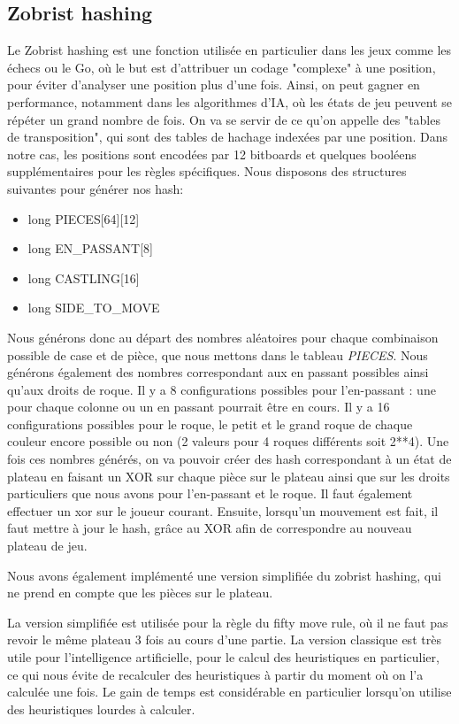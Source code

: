 \documentclass{article}
\begin{document}
\subsection{Zobrist hashing} \label{Zobrist}
Le Zobrist hashing est une fonction utilisée en particulier dans les jeux comme les échecs ou le Go, où le but est d'attribuer un codage "complexe" à
une position, pour éviter d'analyser une position plus d'une fois. Ainsi, on peut gagner en performance, notamment dans les algorithmes d'IA, où les
états de jeu peuvent se répéter un grand nombre de fois. On va se servir de ce qu'on appelle des "tables de transposition", qui sont des tables de
hachage indexées par une position. Dans notre cas, les positions sont encodées par 12 bitboards et quelques booléens
supplémentaires pour les règles spécifiques.
Nous disposons des structures suivantes pour générer nos hash:
\begin{itemize}
    \item long PIECES[64][12]
    \item long EN\_PASSANT[8]
    \item long CASTLING[16]
    \item long SIDE\_TO\_MOVE
\end{itemize}

Nous générons donc au départ des nombres aléatoires pour chaque combinaison possible de case et de pièce, que nous mettons dans le tableau \textit{PIECES}.
Nous générons également des nombres correspondant aux en passant possibles ainsi qu'aux droits de roque. Il y a 8 configurations possibles pour l'en-passant :
une pour chaque colonne ou un en passant pourrait être en cours.
Il y a 16 configurations possibles pour le roque, le petit et le grand roque de chaque couleur encore possible ou non (2 valeurs pour 4 roques différents soit 2**4).
Une fois ces nombres générés, on va pouvoir créer des hash correspondant à un état de plateau en faisant un XOR sur chaque pièce sur le plateau ainsi que sur
les droits particuliers que nous avons pour l'en-passant et le roque. Il faut également effectuer un xor sur le joueur courant.
Ensuite, lorsqu'un mouvement est fait, il faut mettre à jour le hash, grâce au XOR afin de correspondre au nouveau plateau de jeu.

Nous avons également implémenté une version simplifiée du zobrist hashing, qui ne prend en compte que les pièces sur le plateau.

La version simplifiée est utilisée pour la règle du fifty move rule, où il ne faut pas revoir le même plateau 3 fois au cours d'une partie.
La version classique est très utile pour l'intelligence artificielle, pour le calcul des heuristiques en particulier, ce qui nous évite de recalculer des heuristiques
à partir du moment où on l'a calculée une fois. Le gain de temps est considérable en particulier lorsqu'on utilise des heuristiques lourdes à calculer.
\end{document}
